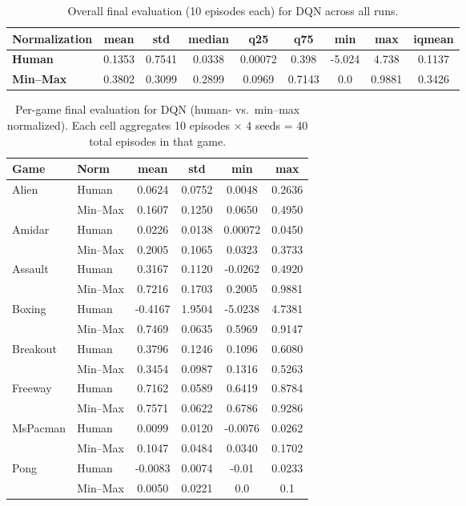 \begin{table}
	\caption{Overall final evaluation (10 episodes each) for DQN across all runs.}
	\label{tab:dqn_eval_overall}
	\centering
	\begin{tabular}{lcccccccc}
		\toprule
		\textbf{Normalization} & \textbf{mean} & \textbf{std} & \textbf{median} & 
		\textbf{q25} & \textbf{q75} & \textbf{min} & \textbf{max} & \textbf{iqmean} \\
		\midrule
		\textbf{Human} & 0.1353 & 0.7541 & 0.0338 & 0.00072 & 0.398 & -5.024 & 4.738 & 0.1137 \\
		\textbf{Min--Max} & 0.3802 & 0.3099 & 0.2899 & 0.0969 & 0.7143 & 0.0 & 0.9881 & 0.3426 \\
		\bottomrule
	\end{tabular}
\end{table}

\begin{table}
	\caption{Per-game final evaluation for DQN (human- vs.\ min--max normalized). 
		Each cell aggregates 10 episodes $\times$ 4 seeds = 40 total episodes in that game.}
	\label{tab:dqn_eval_gamewise}
	\centering
	\begin{tabular}{llcccc}
		\toprule
		\textbf{Game} & \textbf{Norm} & \textbf{mean} & \textbf{std} & \textbf{min} & \textbf{max}\\
		\midrule
		Alien    & Human   & 0.0624 & 0.0752 & 0.0048 & 0.2636 \\
		    & Min--Max & 0.1607 & 0.1250 & 0.0650 & 0.4950 \\
		\cmidrule{1-6}
		Amidar   & Human   & 0.0226 & 0.0138 & 0.00072 & 0.0450 \\
		   & Min--Max & 0.2005 & 0.1065 & 0.0323 & 0.3733 \\
		\cmidrule{1-6}
		Assault  & Human   & 0.3167 & 0.1120 & -0.0262 & 0.4920 \\
		  & Min--Max & 0.7216 & 0.1703 & 0.2005 & 0.9881 \\
		\cmidrule{1-6}
		Boxing   & Human   & -0.4167 & 1.9504 & -5.0238 & 4.7381 \\
		   & Min--Max & 0.7469 & 0.0635 & 0.5969 & 0.9147 \\
		\cmidrule{1-6}
		Breakout & Human   & 0.3796 & 0.1246 & 0.1096 & 0.6080 \\
		 & Min--Max & 0.3454 & 0.0987 & 0.1316 & 0.5263 \\
		\cmidrule{1-6}
		Freeway  & Human   & 0.7162 & 0.0589 & 0.6419 & 0.8784 \\
		  & Min--Max & 0.7571 & 0.0622 & 0.6786 & 0.9286 \\
		\cmidrule{1-6}
		MsPacman & Human   & 0.0099 & 0.0120 & -0.0076 & 0.0262 \\
		 & Min--Max & 0.1047 & 0.0484 & 0.0340 & 0.1702 \\
		\cmidrule{1-6}
		Pong     & Human   & -0.0083 & 0.0074 & -0.01 & 0.0233 \\
		     & Min--Max & 0.0050 & 0.0221 & 0.0 & 0.1 \\
		\bottomrule
	\end{tabular}
\end{table}


